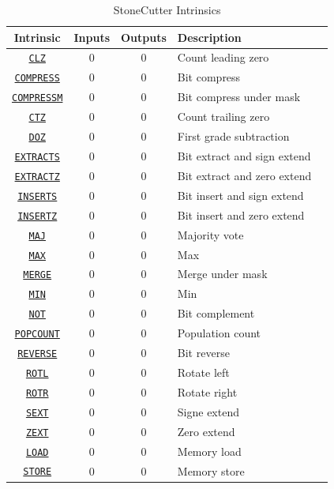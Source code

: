 \documentclass{article}
\begin{document}
\begin{table}[h]
\begin{center}
\caption{StoneCutter Intrinsics}
\vspace{0.125in}
\label{tab:scintrins}
\begin{tabular}{|c|c|c|l|l}
\hline
\textbf{Intrinsic} & \textbf{Inputs} & \textbf{Outputs} & \textbf{Description}\\
\hline
\hyperref[sec:CLZ]{\texttt{CLZ}} & 0 & 0 & Count leading zero\\
\hline
\hyperref[sec:COMPRESS]{\texttt{COMPRESS}} & 0 & 0 & Bit compress\\
\hline
\hyperref[sec:COMPRESSM]{\texttt{COMPRESSM}} & 0 & 0 & Bit compress under mask\\
\hline
\hyperref[sec:CTZ]{\texttt{CTZ}} & 0 & 0 & Count trailing zero\\
\hline
\hyperref[sec:DOZ]{\texttt{DOZ}} & 0 & 0 & First grade subtraction\\
\hline
\hyperref[sec:EXTRACTS]{\texttt{EXTRACTS}} & 0 & 0 & Bit extract and sign extend\\
\hline
\hyperref[sec:EXTRACTZ]{\texttt{EXTRACTZ}} & 0 & 0 & Bit extract and zero extend\\
\hline
\hyperref[sec:INSERTS]{\texttt{INSERTS}} & 0 & 0 & Bit insert and sign extend\\
\hline
\hyperref[sec:INSERTZ]{\texttt{INSERTZ}} & 0 & 0 & Bit insert and zero extend\\
\hline
\hyperref[sec:MAJ]{\texttt{MAJ}} & 0 & 0 & Majority vote\\
\hline
\hyperref[sec:MAX]{\texttt{MAX}} & 0 & 0 & Max\\
\hline
\hyperref[sec:MERGE]{\texttt{MERGE}} & 0 & 0 & Merge under mask\\
\hline
\hyperref[sec:MIN]{\texttt{MIN}} & 0 & 0 & Min\\
\hline
\hyperref[sec:NOT]{\texttt{NOT}} & 0 & 0 & Bit complement\\
\hline
\hyperref[sec:POPCOUNT]{\texttt{POPCOUNT}} & 0 & 0 & Population count\\
\hline
\hyperref[sec:REVERSE]{\texttt{REVERSE}} & 0 & 0 & Bit reverse\\
\hline
\hyperref[sec:ROTL]{\texttt{ROTL}} & 0 & 0 & Rotate left\\
\hline
\hyperref[sec:ROTR]{\texttt{ROTR}} & 0 & 0 & Rotate right\\
\hline
\hyperref[sec:SEXT]{\texttt{SEXT}} & 0 & 0 & Signe extend\\
\hline
\hyperref[sec:ZEXT]{\texttt{ZEXT}} & 0 & 0 & Zero extend\\
\hline
\hyperref[sec:LOAD]{\texttt{LOAD}} & 0 & 0 & Memory load\\
\hline
\hyperref[sec:STORE]{\texttt{STORE}} & 0 & 0 & Memory store\\
\hline
\end{tabular}
\end{center}
\end{table}
\end{document}
